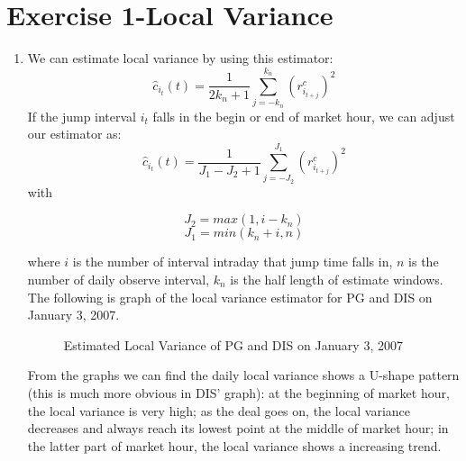 \documentclass[12pt,letterpaper]{article}
\begin{document}
\section*{Exercise 1-Local Variance}
  \begin{enumerate}[label=\textbf{(\Alph*)}]
\item We can estimate local variance by using this estimator:
$$\hat{c}_{i_t}(t)=\frac{1}{2k_n+1}\sum_{j=-k_n}^{k_n}(r_{i_{t+j}}^c)^2$$
If the jump interval $i_t$ falls in the begin or end of market hour, we can adjust our estimator as:
$$\hat{c}_{i_t}(t)=\frac{1}{J_1-J_2+1}\sum_{j=-J_2}^{J_1}(r_{i_{t+j}}^c)^2$$
with

$$J_2=max(1,i-k_n)$$
$$J_1=min(k_n+i,n)$$

where $i$ is the number of interval intraday that jump time falls in, $n$ is the number of daily observe interval, $k_n$ is the half length of estimate windows.\\

The following is graph of the local variance estimator for PG and DIS on January 3, 2007. 
 \begin{figure}[H]
	\centering
	\caption{Estimated Local Variance of PG and DIS on January 3, 2007}
\end{figure}

From the graphs we can find the daily local variance shows a U-shape pattern (this is much more obvious in DIS' graph): at the beginning of market hour, the local variance is very high; as the deal goes on, the local variance decreases and always reach its lowest point at the middle of market hour; in the latter part of market hour, the local variance shows a increasing trend. 


\end{enumerate}
\end{document}
